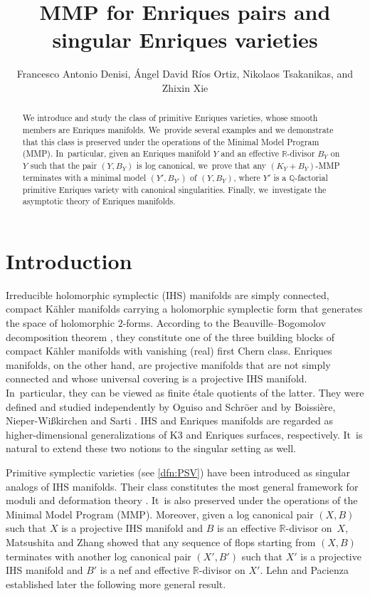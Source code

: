 \documentclass[10pt]{amsart}
\title{MMP for Enriques pairs and singular Enriques varieties}
\author{Francesco Antonio Denisi, Ángel David Ríos Ortiz, Nikolaos Tsakanikas, and Zhixin Xie}
\theoremstyle{plain}
\theoremstyle{definition}
\newcommand{\R}{\mathbb{R}}
\begin{document}
\begin{abstract}
We introduce and study the class of primitive Enriques varieties, whose smooth members are Enriques manifolds. We~provide several examples and we demonstrate that this class is preserved under the operations of the Minimal Model Program (MMP). In~particular, given an Enriques manifold $Y$ and an effective $\mathbb{R}$-divisor $B_Y$ on $Y$ such that the pair $(Y,B_Y)$ is log canonical, we~prove that any $(K_Y + B_Y)$-MMP terminates with a minimal model $(Y',B_{Y'})$ of $(Y,B_Y)$, where $Y'$ is a $\mathbb{Q}$-factorial primitive Enriques variety with canonical singularities. Finally, we~investigate the asymptotic theory of Enriques manifolds.
\end{abstract}
\maketitle
\section{Introduction}

Irreducible holomorphic symplectic (IHS) manifolds are simply connected, compact Kähler manifolds carrying a holomorphic symplectic form that generates the space of holomorphic $2$-forms. According to the Beauville--Bogomolov decomposition theorem \cite{Beauville83a}, they constitute one of the three building blocks of compact Kähler manifolds with vanishing (real) first Chern class.
Enriques manifolds, on the other hand, are projective manifolds that are not simply connected and whose universal covering is a projective IHS manifold. In~particular, they can be viewed as finite étale quotients of the latter. They were defined and studied independently by Oguiso and Schröer \cite{OS11a,OS11b} and by Boissière, Nieper-Wi{\ss}kirchen and Sarti \cite{BNWS11}.
IHS and Enriques manifolds are regarded as higher-dimensional generalizations of K3 and Enriques surfaces, respectively. It~is natural to extend these two notions to the singular setting as well.

Primitive symplectic varieties (see \autoref{dfn:PSV}) have been introduced as singular analogs of IHS manifolds. Their class constitutes the most general framework for moduli and deformation theory \cite{BL21,BL22}. It~is also preserved under the operations of the Minimal Model Program (MMP). Moreover, given a log canonical pair $(X,B)$ such that $X$ is a projective IHS manifold and $B$ is an effective $\R$\nobreakdash-divisor on~$X$, Matsushita and Zhang \cite[Th.\,4.1]{MZ13} showed that any sequence of flops starting from $(X,B)$ terminates with another log canonical pair $(X',B')$ such that $X'$ is a projective IHS manifold and $B'$ is a nef and effective $\R$\nobreakdash-divisor on $X'$. Lehn and Pacienza \cite[Th.\,1.2]{LehnPac16} established later the following more general result.
\end{document}
